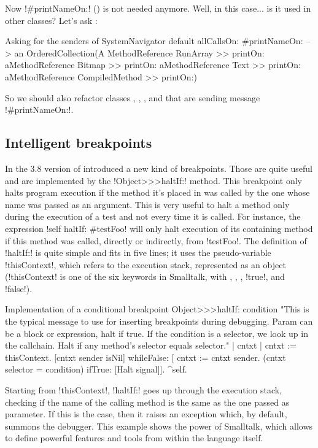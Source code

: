 \documentclass[a4paper,10pt,twoside]{book}
\begin{document}
Now \ct!#printNameOn:! () is not needed anymore. Well, in this case... is it used in other classes? Let's ask \sq:
\begin{example}[sendersofprintnameon]{Asking for the senders of }{}
SystemNavigator default allCallsOn: #printNameOn:
--> an OrderedCollection(A MethodReference RunArray >> printOn: aMethodReference Bitmap >> printOn: aMethodReference Text >> printOn: aMethodReference CompiledMethod >> printOn:)
\end{example}

So we should also refactor classes , , , and  that are sending message \ct!#printNameOn:!.


\subsection{Intelligent breakpoints}

In the 3.8 version of \sq introduced a new kind of breakpoints.
Those are quite useful and are implemented by the \ct!Object>>>haltIf:! method.
This breakpoint only halts program execution if the method it's placed in was called by the one whose name was passed as an argument.
This is very useful to halt a method only during the execution of a test and not every time it is called.
For instance, the expression \ct!self haltIf: #testFoo! will only halt execution of its containing method if this method was called, directly or indirectly, from \ct!testFoo!.
The definition of \ct!haltIf:! is quite simple and fits in five lines; it uses the pseudo-variable \ct!thisContext!, which refers to the execution stack, represented as an object (\ct!thisContext! is one of the six keywords in Smalltalk, with \self, \super, \nil, \ct!true!, and \ct!false!).

\begin{method}[objecthaltif]{Implementation of a conditional breakpoint}
Object>>>haltIf: condition
	"This is the typical message to use for inserting breakpoints during debugging. Param can be a block or expression, halt if true.
	If the condition is a selector, we look up in the callchain. Halt if any method's selector equals selector."
	| cntxt |
	cntxt := thisContext.
	[cntxt sender isNil] whileFalse: [
		cntxt := cntxt sender.
		(cntxt selector = condition) ifTrue: [Halt signal]].
	^self.
\end{method}

Starting from \ct!thisContext!, \ct!haltIf:! goes up through the execution stack, checking if the name of the calling method is the same as the one passed as parameter.
If this is the case, then it raises an exception which, by default, summons the debugger.
This example shows the power of Smalltalk, which allows to define powerful features and tools from within the language itself.
\end{document}
